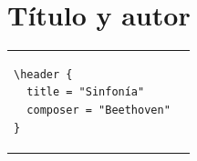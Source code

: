 \documentclass[10pt,a4paper,oneside,headinclude,titlepage]{scrartcl}
\begin{document}
\section*{Título y autor}
\begin{tabular}{m{3cm}m{9cm}}
\begin{verbatim}
\header {
  title = "Sinfonía"
  composer = "Beethoven"
}
\end{verbatim}
&
\begin[line-width=10\cm]{lilypond}
    \header {
      title = "Sinfonía"
      instrument=" "  %
      composer = "Beethoven"
    }
\end{lilypond}
\end{tabular}
\end{document}
